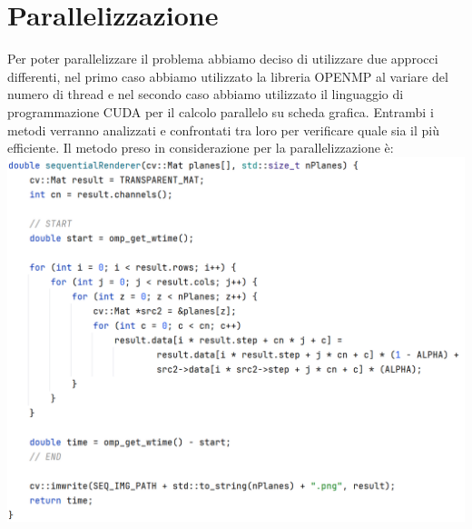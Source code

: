 \documentclass[11pt]{article}
\begin{document}
    \section{Parallelizzazione}\label{sec:parallelizazzione}
    Per poter parallelizzare il problema abbiamo deciso di utilizzare due approcci differenti, nel primo caso abbiamo
    utilizzato la libreria OPENMP al variare del numero di thread e nel secondo caso abbiamo utilizzato il linguaggio di
    programmazione CUDA per il calcolo parallelo su scheda grafica\@.
    Entrambi i metodi verranno analizzati e confrontati tra loro per verificare quale sia il più efficiente.
    Il metodo preso in considerazione per la parallelizzazione è:
    \includegraphics[width=\textwidth]{../documentation/img/code (1)}
\end{document}
